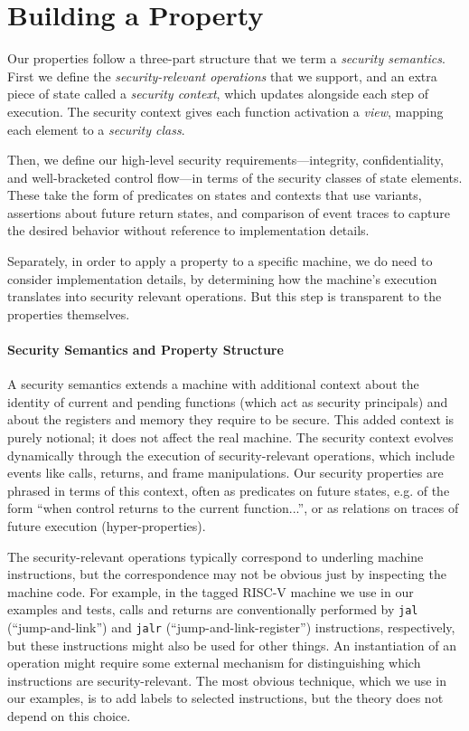 \documentclass[10pt,conference]{ieeetran}%
\theoremstyle{definition}
\begin{document}
\section{Building a Property}
\label{sec:ideas}

Our properties follow a three-part structure that we term a {\em security semantics}.
First we define the {\em security-relevant operations} that we support, and an extra
piece of state called a {\em security context}, which updates alongside each step
of execution. The security context gives each function activation a {\em view},
mapping each element to a {\em security class}.

Then, we define our high-level security requirements---integrity, confidentiality,
and well-bracketed control flow---in terms of the security classes of state
elements. These take the form of predicates on states and contexts that use variants,
assertions about future return states, and comparison of event traces to capture the
desired behavior without reference to implementation details.

Separately, in order to apply a property to a specific machine, we do need to consider
implementation details, by determining how the machine's execution translates into
security relevant operations. But this step is transparent to the properties themselves.


\paragraph*{Security Semantics and Property Structure}

A security semantics extends a machine
with additional context about the identity of current and pending
functions (which act as security principals) and about the registers and memory they require
to be secure. This added context is purely notional;
it does not affect the real machine. The security context
evolves dynamically through the execution of security-relevant operations,
which include events like calls, returns, and frame manipulations.
Our security properties are phrased in terms of this context, often as predicates
on future states, e.g. of the form ``when control returns to the current function...'',
or as relations on traces of future execution (hyper-properties).

The security-relevant operations typically correspond to underling machine instructions,
but the correspondence may not be obvious just by inspecting the machine code.
For example, in the tagged RISC-V machine we use in our examples and tests,
calls and returns are conventionally performed by {\tt jal} (``jump-and-link'')
and {\tt jalr} (``jump-and-link-register'') instructions, respectively, but these
instructions might also be used for other things. An instantiation of an operation
might require some external mechanism for distinguishing which instructions are
security-relevant. The most obvious technique, which we use in our examples, is to add labels to
selected instructions, but the theory does not depend on this choice.
\end{document}
